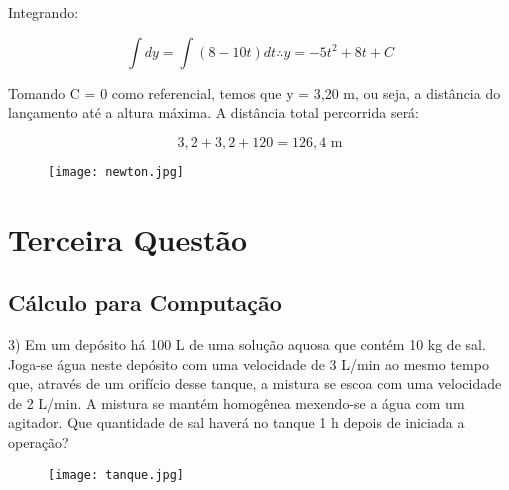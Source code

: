 \documentclass{beamer}
\begin{document}
	\begin{frame}
		
		Integrando:
		
		\begin{displaymath}
			\int dy = \int (8 - 10t) dt \therefore  y = -5t^2 +8t + C
		\end{displaymath}
		
		Tomando C = 0 como referencial, temos que y = 3,20 m, ou seja, a distância do lançamento até a altura máxima. A distância total percorrida será:
		
		\begin{displaymath}
			3,2 + 3,2 + 120 = \boxed{ 126,4 \text{ m} }
		\end{displaymath}
		
		\begin{figure}
			\centering
			\texttt{[image: newton.jpg]}
			\label{}
		\end{figure}
		
	\end{frame}
	\setcounter{equation}{0}
	
	\section{Terceira Questão}
	\subsection{Cálculo para Computação}
	\begin{frame}
		3) Em um depósito há 100 L de uma solução aquosa que contém 10 kg de sal. Joga-se água neste depósito com uma velocidade de 3 L/min ao mesmo tempo que, através de um orifício desse tanque, a mistura se escoa com uma velocidade de 2 L/min. A mistura se mantém homogênea mexendo-se a água com um agitador. Que quantidade de sal haverá no tanque 1 h depois de iniciada a operação?
		
		\begin{figure}
			\centering
			\texttt{[image: tanque.jpg]}
			\label{}
		\end{figure}
	\end{frame}
	\setcounter{equation}{0}
\end{document}
